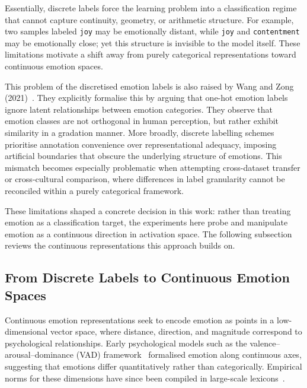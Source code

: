 Essentially, discrete labels force the learning problem into a classification regime that cannot capture continuity, geometry, or arithmetic structure. For example, two samples labeled \texttt{joy} may be emotionally distant, while \texttt{joy} and \texttt{contentment} may be emotionally close; yet this structure is invisible to the model itself. These limitations motivate a shift away from purely categorical representations toward continuous emotion spaces.

This problem of the discretised emotion labels is also raised  by Wang and Zong (2021)~\cite{wang-zong-2021-distributed}. They explicitly formalise this by arguing that one-hot emotion labels ignore latent relationships between emotion categories. They observe that emotion classes are not orthogonal in human perception, but rather exhibit similarity in a gradation manner. More broadly, discrete labelling schemes prioritise annotation convenience over representational adequacy, imposing artificial boundaries that obscure the underlying structure of emotions. This mismatch becomes especially problematic when attempting cross-dataset transfer or cross-cultural comparison, where differences in label granularity cannot be reconciled within a purely categorical framework.

These limitations shaped a concrete decision in this work: rather than treating emotion as a classification target, the experiments here probe and manipulate emotion as a continuous direction in activation space. The following subsection reviews the continuous representations this approach builds on.

\subsection{From Discrete Labels to Continuous Emotion Spaces}

Continuous emotion representations seek to encode emotion as points in a low-dimensional vector space, where distance, direction, and magnitude correspond to psychological relationships. Early psychological models such as the valence--arousal--dominance (VAD) framework~\cite{MehrabianRussell1974} formalised emotion along continuous axes, suggesting that emotions differ quantitatively rather than categorically. Empirical norms for these dimensions have since been compiled in large-scale lexicons~\cite{mohammad2025nrcvadlexiconv2}.

